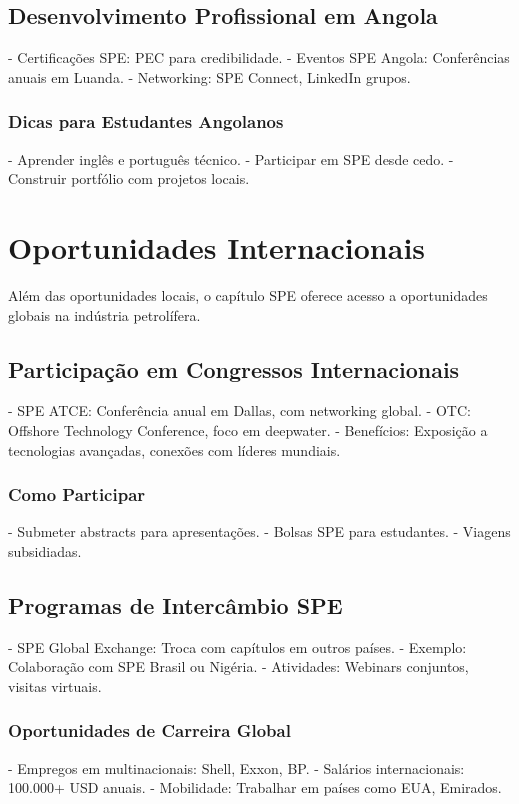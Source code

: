 \documentclass[12pt]{article}
\begin{document}
\subsection{Desenvolvimento Profissional em Angola}
- Certificações SPE: PEC para credibilidade.
- Eventos SPE Angola: Conferências anuais em Luanda.
- Networking: SPE Connect, LinkedIn grupos.

\subsubsection{Dicas para Estudantes Angolanos}
- Aprender inglês e português técnico.
- Participar em SPE desde cedo.
- Construir portfólio com projetos locais.

\section{Oportunidades Internacionais}

Além das oportunidades locais, o capítulo SPE oferece acesso a oportunidades globais na indústria petrolífera.

\subsection{Participação em Congressos Internacionais}
- SPE ATCE: Conferência anual em Dallas, com networking global.
- OTC: Offshore Technology Conference, foco em deepwater.
- Benefícios: Exposição a tecnologias avançadas, conexões com líderes mundiais.

\subsubsection{Como Participar}
- Submeter abstracts para apresentações.
- Bolsas SPE para estudantes.
- Viagens subsidiadas.

\subsection{Programas de Intercâmbio SPE}
- SPE Global Exchange: Troca com capítulos em outros países.
- Exemplo: Colaboração com SPE Brasil ou Nigéria.
- Atividades: Webinars conjuntos, visitas virtuais.

\subsubsection{Oportunidades de Carreira Global}
- Empregos em multinacionais: Shell, Exxon, BP.
- Salários internacionais: 100.000+ USD anuais.
- Mobilidade: Trabalhar em países como EUA, Emirados.
\end{document}
